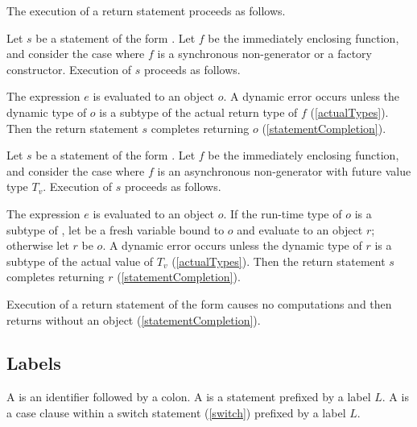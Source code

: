 \documentclass[makeidx]{article}
\begin{document}
{\LMHash{}%
The execution of a return statement proceeds as follows.

\LMHash{}%
Let $s$ be a statement of the form .
%
Let $f$ be the immediately enclosing function,
and consider the case where $f$ is a synchronous non-generator
or a factory constructor.
Execution of $s$ proceeds as follows.

\LMHash{}%
The expression $e$ is evaluated to an object $o$.
A dynamic error occurs unless the dynamic type of $o$ is a subtype of
the actual return type of $f$
(\ref{actualTypes}).
Then the return statement $s$ completes returning $o$
(\ref{statementCompletion}).


\LMHash{}%
Let $s$ be a statement of the form .
%
Let $f$ be the immediately enclosing function,
and consider the case where $f$ is an asynchronous non-generator
with future value type $T_v$.
Execution of $s$ proceeds as follows.

\LMHash{}%
The expression $e$ is evaluated to an object $o$.
If the run-time type of $o$ is a subtype of ,
let  be a fresh variable bound to $o$ and
evaluate  to an object $r$;
otherwise let $r$ be $o$.
A dynamic error occurs unless the dynamic type of $r$
is a subtype of the actual value of $T_v$
(\ref{actualTypes}).
Then the return statement $s$ completes returning $r$
(\ref{statementCompletion}).
\EndCase


\LMHash{}%
Execution of a return statement of the form \code{\RETURN;}
causes no computations and then returns without an object
(\ref{statementCompletion}).


\subsection{Labels}

\LMHash{}%
A  is an identifier followed by a colon.
A  is a statement prefixed by a label $L$.
A  is a case clause within a switch statement
(\ref{switch})
prefixed by a label $L$.

}
\end{document}
